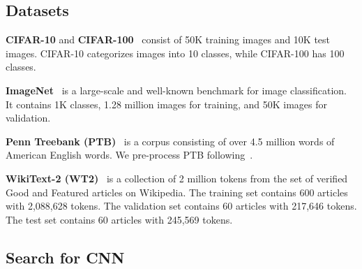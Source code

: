 \documentclass[10pt,twocolumn,letterpaper]{article}
\begin{document}
\subsection{Datasets}\label{sec:exp-data}


\textbf{CIFAR-10} and \textbf{CIFAR-100}~\cite{krizhevsky2009learning} consist of 50K training images and 10K test images.
CIFAR-10 categorizes images into 10 classes, while CIFAR-100 has 100 classes.


\textbf{ImageNet}~\cite{russakovsky2015imagenet} is a large-scale and well-known benchmark for image classification. It contains 1K classes, 1.28 million images for training, and 50K images for validation.



\textbf{Penn Treebank (PTB)}~\cite{marcus1993building} is a corpus consisting of over 4.5 million words of American English words. We pre-process PTB following~\cite{merity2017pointer,merity2018regularizing}.



\textbf{WikiText-2 (WT2)}~\cite{merity2017pointer} is a collection of 2 million tokens from the set of verified Good and Featured articles on Wikipedia. The training set contains 600 articles with 2,088,628 tokens. The validation set contains 60 articles with 217,646 tokens. The test set contains 60 articles with 245,569 tokens.









\subsection{Search for CNN}\label{sec:exp-cnn}
\end{document}
